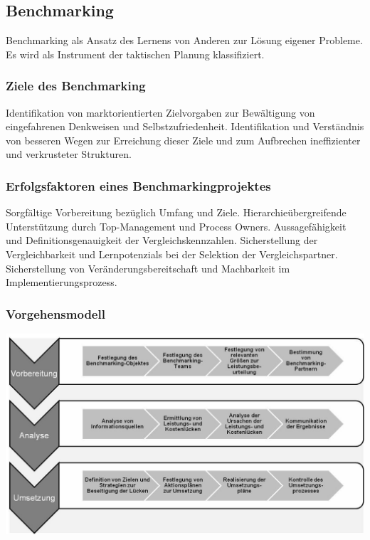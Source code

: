 \documentclass{article}
\begin{document}
\subsection{Benchmarking}
Benchmarking als Ansatz des Lernens von Anderen zur Lösung eigener
Probleme. Es wird als Instrument der taktischen Planung klassifiziert.
\subsubsection{Ziele des Benchmarking} 
Identifikation von marktorientierten Zielvorgaben zur Bewältigung von
eingefahrenen Denkweisen und Selbstzufriedenheit.
Identifikation und Verständnis von besseren Wegen zur Erreichung dieser
Ziele und zum Aufbrechen ineffizienter und verkrusteter Strukturen.
\subsubsection{Erfolgsfaktoren eines Benchmarkingprojektes}
Sorgfältige Vorbereitung bezüglich Umfang und Ziele.
Hierarchieübergreifende Unterstützung durch Top-Management und
Process Owners.
Aussagefähigkeit und Definitionsgenauigkeit der Vergleichskennzahlen.
Sicherstellung der Vergleichbarkeit und Lernpotenzials bei der Selektion
der Vergleichspartner.
Sicherstellung von Veränderungsbereitschaft und Machbarkeit im
Implementierungsprozess.
\subsubsection{Vorgehensmodell}
\begin{center}
\includegraphics[scale=.5]{benchmarkingmodel.png}
\end{center}
\end{document}
